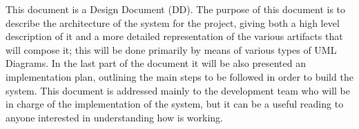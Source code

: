 This document is a Design Document (DD). The purpose of this document is to describe the architecture of the system for the \projectname project, giving both a high level description of it and a more detailed representation of the various artifacts that will compose it; this will be done primarily by means of various types of UML Diagrams. In the last part of the document it will be also presented an implementation plan, outlining the main steps to be followed in order to build the system. This document is addressed mainly to the development team who will be in charge of the implementation of the system, but it can be a useful reading to anyone interested in understanding how \projectname is working.